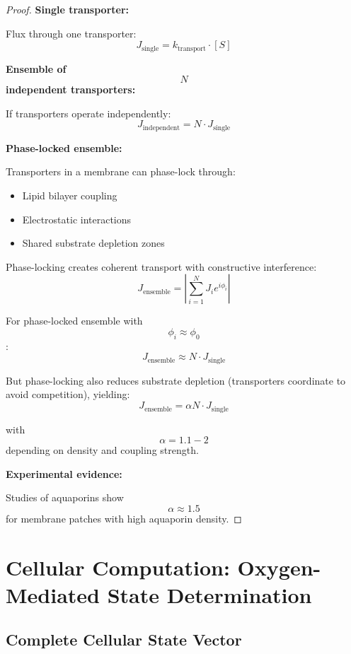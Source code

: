 \documentclass[12pt,a4paper]{article}
\begin{document}
\begin{proof}
\textbf{Single transporter:}

Flux through one transporter:
$$
J_{\text{single}} = k_{\text{transport}} \cdot [S]
$$

\textbf{Ensemble of $$N$$ independent transporters:}

If transporters operate independently:
$$
J_{\text{independent}} = N \cdot J_{\text{single}}
$$

\textbf{Phase-locked ensemble:}

Transporters in a membrane can phase-lock through:
\begin{itemize}
\item Lipid bilayer coupling
\item Electrostatic interactions
\item Shared substrate depletion zones
\end{itemize}

Phase-locking creates coherent transport with constructive interference:
$$
J_{\text{ensemble}} = \left| \sum_{i=1}^N J_i e^{i\phi_i} \right|
$$

For phase-locked ensemble with $$\phi_i \approx \phi_0$$:
$$
J_{\text{ensemble}} \approx N \cdot J_{\text{single}}
$$

But phase-locking also reduces substrate depletion (transporters coordinate to avoid competition), yielding:
$$
J_{\text{ensemble}} = \alpha N \cdot J_{\text{single}}
$$

with $$\alpha = 1.1 - 2$$ depending on density and coupling strength.

\textbf{Experimental evidence:}

Studies of aquaporins show $$\alpha \approx 1.5$$ for membrane patches with high aquaporin density.
\end{proof}

\section{Cellular Computation: Oxygen-Mediated State Determination}

\subsection{Complete Cellular State Vector}
\end{document}
